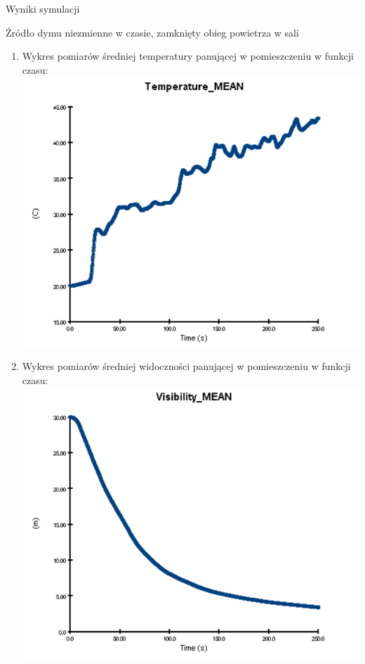 \documentclass[a4paper, 12pt]{scrartcl}
\begin{document}
	\begin{section}{Wyniki symulacji}
		\begin{subsection}{Źródło dymu niezmienne w czasie, zamknięty obieg powietrza w sali}
			\begin{enumerate}[i]
				\item Wykres pomiarów średniej temperatury panującej w pomieszczeniu w funkcji czasu: \\
				\includegraphics{../H24_Constant_Smoke/temperature} \newpage
				\item Wykres pomiarów średniej widoczności panującej w pomieszczeniu w funkcji czasu:
				\includegraphics{../H24_Constant_Smoke/visibility}
			\end{enumerate}
		\end{subsection}
		

\end{section}
\end{document}
